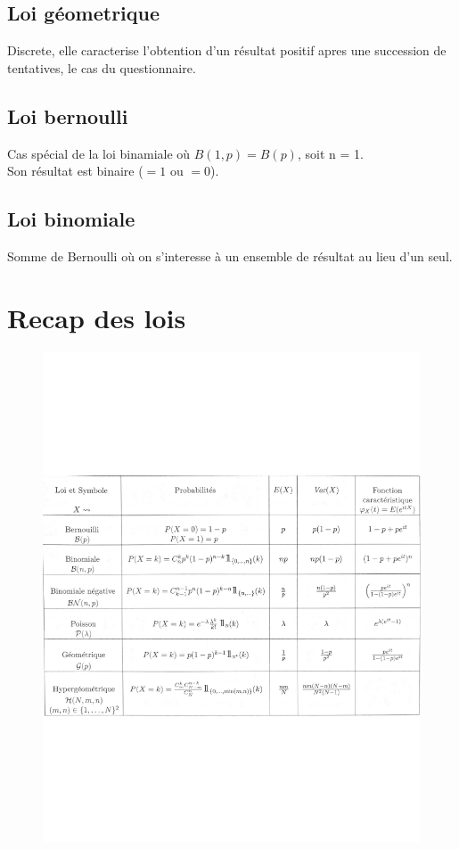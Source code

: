 \documentclass[11pt]{article}
\newcommand{\squeezeup}{\vspace{-4.5cm}}
\begin{document}
\subsection{Loi géometrique}
Discrete, elle caracterise l'obtention d'un résultat positif apres une succession de tentatives, le cas du questionnaire.

\subsection{Loi bernoulli}
Cas spécial de la loi binamiale où $B(1,p) = B(p)$, soit n = 1.\\ 
Son résultat est binaire ($=1$ ou $=0$).

\subsection{Loi binomiale}
Somme de Bernoulli où on s'interesse à un ensemble de résultat au lieu d'un seul.

\pagebreak
\section{Recap des lois}
\squeezeup
\begin{figure}[h!]
    \centering
    \includegraphics[scale=0.7]{img/recap.pdf}
\end{figure}
\end{document}
